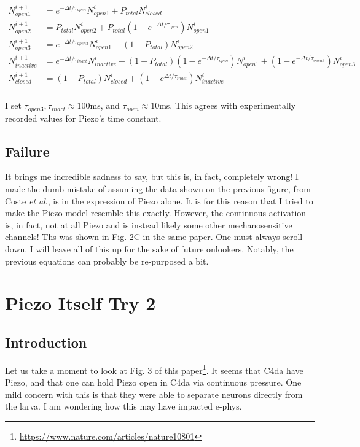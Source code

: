 \documentclass[12pt]{amsart}
\newcommand{\pr}[1]{\left(#1\right)}
\begin{document}
\begin{equation} \label{eq8}
\begin{split}
N_{open1}^{i+1} &=  e^{-\Delta t / \tau_{open}}N_{open1}^{i} + P_{total}N_{closed}^{i} \\ 
N_{open2}^{i+1} &= P_{total}N_{open2}^{i} + P_{total}\pr{1-e^{-\Delta t / \tau_{open}}}N_{open1}^{i} \\ 
N_{open3}^{i+1} &=  e^{-\Delta t / \tau_{open3}}N_{open1}^{i} + \pr{1-P_{total}}N_{open2}^{i}\\ 
N_{inactive}^{i+1} &= e^{-\Delta t / \tau_{inact}}N_{inactive}^{i} + \pr{1-P_{total}}\pr{1-e^{-\Delta t / \tau_{open}}}N_{open1}^{i} + \pr{1-e^{-\Delta t / \tau_{open3}}}N_{open3}^{i}\\
N_{closed}^{i+1} &= \pr{1 - P_{total}}N_{closed}^{i} + \pr{1-e^{\Delta t / \tau_{inact}}}N_{inactive}^{i} \\
\end{split}
\end{equation}

\bigskip

I set $\tau_{open3}, \tau_{inact} \approx 100$ms, and $\tau_{open} \approx 10$ms. This agrees with experimentally recorded values for Piezo's time constant. 



\bigskip

\subsection{Failure} It brings me incredible sadness to say, but this is, in fact, completely wrong! I made the dumb mistake of assuming the data shown on the previous figure, from Coste \textit{et al}., is in the expression of Piezo alone. It is for this reason that I tried to make the Piezo model resemble this exactly. However, the continuous activation is, in fact, not at all Piezo and is instead likely some other mechanosensitive channels! Ths was shown in Fig. 2C in the same paper. One must always scroll down. I will leave all of this up for the sake of future onlookers. Notably, the previous equations can probably be re-purposed a bit. 


 \section{Piezo Itself Try 2}

 \subsection{Introduction} Let us take a moment to look at Fig. 3 of this paper\footnote{\url{https://www.nature.com/articles/nature10801}}. It seems that C4da have Piezo, and that one can hold Piezo open in C4da via continuous pressure. One mild concern with this is that they were able to separate neurons directly from the larva. I am wondering how this may have impacted e-phys. 
\end{document}
